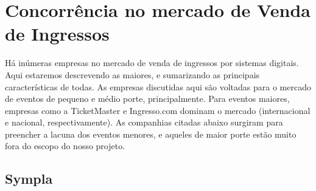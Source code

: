 \documentclass[12pt,a4paper,twoside,hyphens,english,brazil]{abntex2}
\begin{document}
\section{Concorrência no mercado de Venda de Ingressos} \label{sec:sistemas:venda}
Há inúmeras empresas no mercado de venda de ingressos por sistemas digitais. Aqui estaremos descrevendo as maiores, e sumarizando as principais características de todas. As empresas discutidas aqui são voltadas para o mercado de eventos de pequeno e médio porte, principalmente. Para eventos maiores, empresas como a TicketMaster e Ingresso.com dominam o mercado (internacional e nacional, respectivamente). As companhias citadas abaixo surgiram para preencher a lacuna dos eventos menores, e aqueles de maior porte estão muito fora do escopo do nosso projeto.

\subsection{Sympla}
\end{document}
